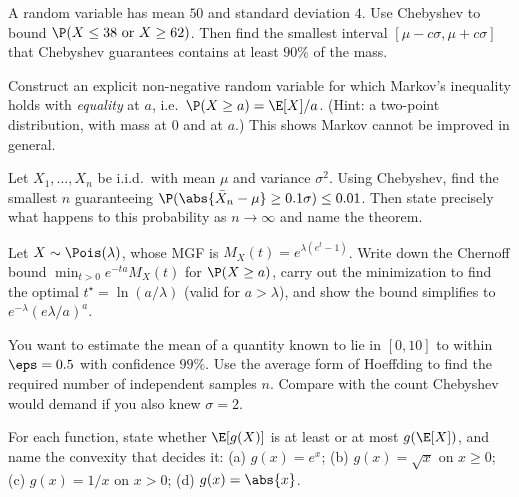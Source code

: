 \begin{exercise}
\label{ch19:ex-cheb}
A random variable has mean $50$ and standard deviation $4$. Use Chebyshev to
bound $\P(X \le 38 \text{ or } X \ge 62)$. Then find the smallest interval
$[\mu - c\sigma, \mu + c\sigma]$ that Chebyshev guarantees contains at least
$90\%$ of the mass.
\end{exercise}

\begin{exercise}
\label{ch19:ex-sharp}
Construct an explicit non-negative random variable for which Markov's
inequality holds with \emph{equality} at $a$, i.e.\ $\P(X\ge a) = \E[X]/a$.
(Hint: a two-point distribution, with mass at $0$ and at $a$.) This shows
Markov cannot be improved in general.
\end{exercise}

\begin{exercise}
\label{ch19:ex-wlln}
Let $X_1,\dots,X_n$ be i.i.d.\ with mean $\mu$ and variance $\sigma^2$. Using
Chebyshev, find the smallest $n$ guaranteeing
$\P(\abs{\bar X_n - \mu} \ge 0.1\sigma) \le 0.01$. Then state precisely what
happens to this probability as $n\to\infty$ and name the theorem.
\end{exercise}

\begin{exercise}
\label{ch19:ex-chernoff-pois}
Let $X \sim \Pois(\lambda)$, whose MGF is $M_X(t) = e^{\lambda(e^t - 1)}$.
Write down the Chernoff bound $\min_{t>0} e^{-ta}M_X(t)$ for $\P(X \ge a)$,
carry out the minimization to find the optimal $t^\star = \ln(a/\lambda)$
(valid for $a>\lambda$), and show the bound simplifies to
$e^{-\lambda}(e\lambda/a)^a$.
\end{exercise}

\begin{exercise}
\label{ch19:ex-hoeff-n}
You want to estimate the mean of a quantity known to lie in $[0,10]$ to within
$\eps = 0.5$ with confidence $99\%$. Use the average form of Hoeffding to find
the required number of independent samples $n$. Compare with the count
Chebyshev would demand if you also knew $\sigma = 2$.
\end{exercise}

\begin{exercise}
\label{ch19:ex-jensen-dir}
For each function, state whether $\E[g(X)]$ is at least or at most $g(\E[X])$,
and name the convexity that decides it: (a) $g(x) = e^x$; (b)
$g(x) = \sqrt{x}$ on $x \ge 0$; (c) $g(x) = 1/x$ on $x > 0$; (d)
$g(x) = \abs{x}$.
\end{exercise}

